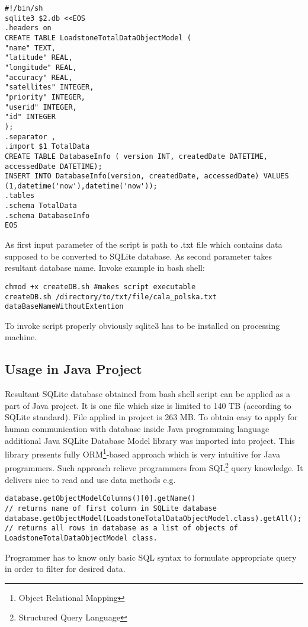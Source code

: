 \begin{lstlisting}[style=BASH]	
#!/bin/sh
sqlite3 $2.db <<EOS
.headers on
CREATE TABLE LoadstoneTotalDataObjectModel (
"name" TEXT,
"latitude" REAL,
"longitude" REAL,
"accuracy" REAL,
"satellites" INTEGER,
"priority" INTEGER,
"userid" INTEGER,
"id" INTEGER
);
.separator ,
.import $1 TotalData
CREATE TABLE DatabaseInfo ( version INT, createdDate DATETIME, accessedDate DATETIME);
INSERT INTO DatabaseInfo(version, createdDate, accessedDate) VALUES (1,datetime('now'),datetime('now'));
.tables
.schema TotalData
.schema DatabaseInfo
EOS
\end{lstlisting}

As first input parameter of the script is path to .txt file which contains data supposed to be converted to SQLite database. As second parameter takes resultant database name. Invoke example in bash shell:
\begin{lstlisting}[style=BASH]
chmod +x createDB.sh #makes script executable
createDB.sh /directory/to/txt/file/cala_polska.txt dataBaseNameWithoutExtention
\end{lstlisting}
To invoke script properly obviously sqlite3 has to be installed on processing machine. 

\subsection{Usage in Java Project}
Resultant SQLite database obtained from bash shell script can be applied as a part of Java project. It is one file which size is limited to 140 TB (according to SQLite standard). File applied in project is 263 MB. To obtain easy to apply for human communication with database inside Java programming language additional Java SQLite Database Model library was imported into project. \cite{31} This library presents fully ORM\footnote{Object Relational Mapping}-based approach which is very intuitive for Java programmers. Such approach relieve programmers from SQL\footnote{Structured Query Language} query knowledge. It delivers nice to read and use data methods e.g.
\begin{lstlisting}[style=JAVA]
database.getObjectModelColumns()[0].getName()
// returns name of first column in SQLite database
database.getObjectModel(LoadstoneTotalDataObjectModel.class).getAll();
// returns all rows in database as a list of objects of LoadstoneTotalDataObjectModel class.
\end{lstlisting}
Programmer has to know only basic SQL syntax to formulate appropriate query in order to filter for desired data.
